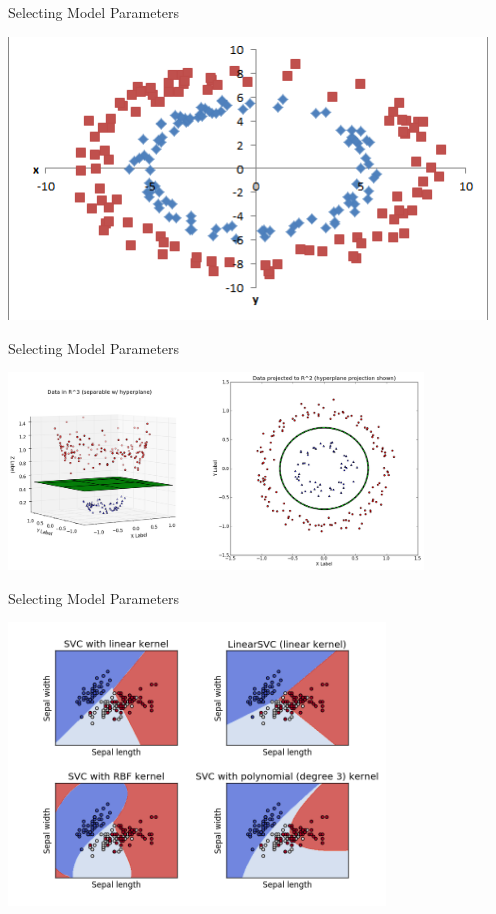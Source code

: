 \documentclass[10pt]{beamer}
\begin{document}
\begin{frame}[fragile]{Selecting Model Parameters}
  
    \centerline{\includegraphics[height=7.5cm]{svmcircles.png}}


\end{frame}

\begin{frame}[fragile]{Selecting Model Parameters}
  
    \centerline{\includegraphics[width=11cm]{implicitprojection.png}}


\end{frame}

\begin{frame}[fragile]{Selecting Model Parameters}
  
    \centerline{\includegraphics[width=10cm]{kernels.png}}


\end{frame}
\end{document}
